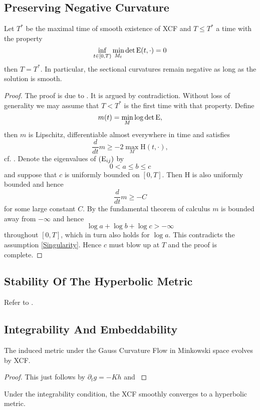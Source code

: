 \documentclass[a4paper, 12pt]{amsart}
\begin{document}
\subsection{Preserving Negative Curvature}
\label{subsec:xcf_preserving}
\begin{prop}
Let $T^{\ast}$ be the maximal time of smooth existence of XCF and $T\leq T^{\ast}$ a time with the property
\begin{equation}\label{Singularity}\inf_{t\in[0,T)}\min_{M_t}\det \operatorname{E}(t,\cdot)=0
\end{equation}
then $T=T^\ast$. In particular, the sectional curvatures remain negative as long as the solution is smooth.
\end{prop}
\begin{proof}
The proof is due to \cite{MR2055396}. It is argued by contradiction.
Without loss of generality we may assume that $T<T^\ast$ is the first time with that property. Define 
\[m(t)=\min_{M}\log \det \operatorname{E},\]
then $m$ is Lipschitz, differentiable almost everywhere in time and satisfies
\[\frac{d}{dt} m\geq -2\max_{M}\mathrm{H}(t,\cdot),\]
cf. \cite[Proposition 9]{MR2055396}. Denote the eigenvalues of $(\operatorname{E}_{ij})$ by 
\[0<a\leq b\leq c\]
and suppose that $c$ is uniformly bounded on $[0,T]$. Then $\mathrm{H}$ is also uniformly bounded and hence
\[\frac{d}{dt}m\geq -C\] for some large constant $C$. By the fundamental theorem of calculus $m$ is bounded away from $-\infty$ and hence
\[\log a+\log b+\log c>-\infty\]
throughout $[0,T]$, which in turn also holds for $\log a$. This contradicts the assumption \eqref{Singularity}. Hence $c$ must blow up at $T$ and the proof is complete.
\end{proof}
\subsection{Stability Of The Hyperbolic Metric}
\label{subsec:xcf_stability}

{\color{red} Refer to \cite{MR2448593}.}

\subsection{Integrability And Embeddability}
\label{subsec:xcf_gcf}
\begin{lemma}
\label{lem:xcf_gcf}
The induced metric under the Gauss Curvature Flow in Minkowski space evolves by XCF.
\end{lemma}
\begin{proof}
{\color{red} This just follows by \(\partial_t g = -K h\) and }
\end{proof}
\begin{thm}
\label{thm:xcf_integrable_convergence}
Under the integrability condition, the XCF smoothly converges to a hyperbolic metric.
\end{thm}
\end{document}
